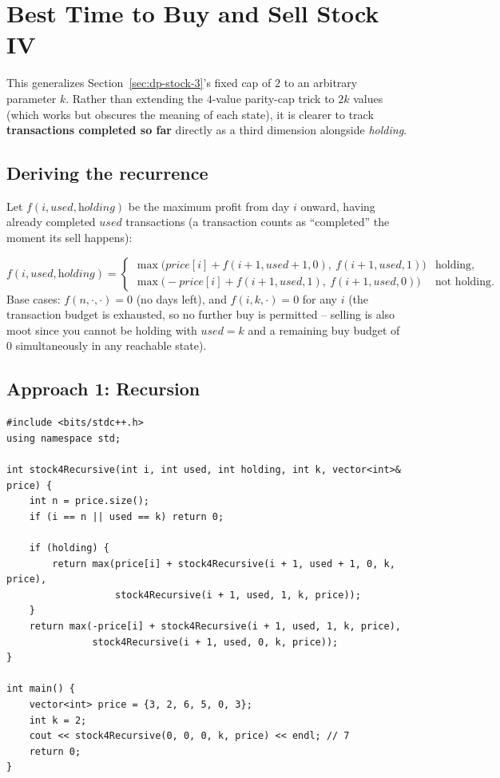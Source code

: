 \section{Best Time to Buy and Sell Stock IV}
\label{sec:dp-stock-4}


\begin{patternbox}
This generalizes Section~\ref{sec:dp-stock-3}'s fixed cap of $2$ to an
arbitrary parameter $k$. Rather than extending the $4$-value parity-cap
trick to $2k$ values (which works but obscures the meaning of each
state), it is clearer to track \textbf{transactions completed so far}
directly as a third dimension alongside \textit{holding}.
\end{patternbox}

\subsection*{Deriving the recurrence}

Let $f(i, \textit{used}, \textit{holding})$ be the maximum profit from
day $i$ onward, having already completed $\textit{used}$ transactions
(a transaction counts as ``completed'' the moment its sell happens):

\[
  f(i, \textit{used}, \textit{holding}) =
  \begin{cases}
    \max\big(\textit{price}[i] + f(i{+}1, \textit{used}{+}1, 0),\
    f(i{+}1, \textit{used}, 1)\big) & \text{holding}, \\
    \max\big(-\textit{price}[i] + f(i{+}1, \textit{used}, 1),\
    f(i{+}1, \textit{used}, 0)\big) & \text{not holding.}
  \end{cases}
\]
Base cases: $f(n, \cdot, \cdot) = 0$ (no days left), and
$f(i, k, \cdot) = 0$ for any $i$ (the transaction budget is exhausted,
so no further buy is permitted -- selling is also moot since you cannot
be holding with $\textit{used}=k$ and a remaining buy budget of $0$
simultaneously in any reachable state).

\subsection*{Approach 1: Recursion}

\begin{lstlisting}
#include <bits/stdc++.h>
using namespace std;

int stock4Recursive(int i, int used, int holding, int k, vector<int>& price) {
    int n = price.size();
    if (i == n || used == k) return 0;

    if (holding) {
        return max(price[i] + stock4Recursive(i + 1, used + 1, 0, k, price),
                   stock4Recursive(i + 1, used, 1, k, price));
    }
    return max(-price[i] + stock4Recursive(i + 1, used, 1, k, price),
               stock4Recursive(i + 1, used, 0, k, price));
}

int main() {
    vector<int> price = {3, 2, 6, 5, 0, 3};
    int k = 2;
    cout << stock4Recursive(0, 0, 0, k, price) << endl; // 7
    return 0;
}
\end{lstlisting}

